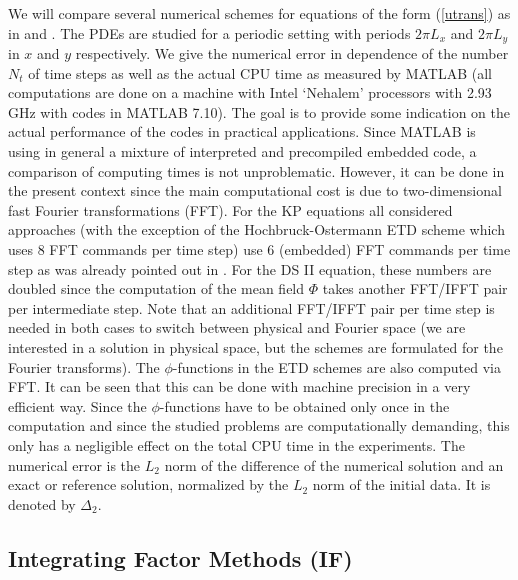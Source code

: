 \documentclass[final]{siamltex}
\begin{document}
We will compare several numerical schemes for equations of the form 
(\ref{utrans}) as in \cite{KassT} and \cite{ckkdvnls}. The PDEs are 
studied for a periodic setting with periods $2\pi L_{x}$ and $2\pi 
L_{y}$ in $x$ and $y$ respectively. We give the numerical error in 
dependence of the number $N_{t}$ of time steps as well as the actual CPU time as measured by MATLAB 
(all computations are done on a machine with Intel  `Nehalem' 
processors with 2.93 GHz with codes in MATLAB 7.10). The goal 
is to provide some indication on the actual performance of the codes 
in practical applications. 
Since MATLAB is using in general a mixture of interpreted and precompiled embedded code, 
a comparison of computing times is not unproblematic. However, it can 
be done in the present context since the main computational cost  is 
due to 
two-dimensional fast Fourier transformations (FFT). For the KP equations all considered approaches 
(with the exception of the Hochbruck-Ostermann ETD scheme which 
uses 8 FFT commands per time step) use 6 (embedded) FFT commands per time step as 
was already pointed out in \cite{D}. For the DS II equation, these 
numbers are doubled since the computation of the mean field $\Phi$ 
takes another FFT/IFFT pair per intermediate step. Note that an 
additional FFT/IFFT pair per time step is needed in both cases to switch 
between physical and Fourier space (we are interested in a solution 
in physical space, but the schemes are formulated for the Fourier 
transforms). 
The $\phi$-functions in the ETD schemes are
also computed via FFT. It can be seen that this 
can be done with machine precision in a very efficient way. 
Since the $\phi$-functions have to be obtained only once in the computation and since the 
studied problems are computationally demanding, this only has a negligible 
effect on the total CPU time in the experiments.
The numerical error is the $L_{2}$ norm of the difference of 
the numerical solution and an exact or reference solution, normalized by the	
$L_{2}$ norm of the initial data. It is denoted by $\Delta_{2}$. 


\subsection{Integrating Factor Methods (IF)}
\end{document}
